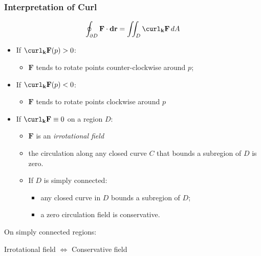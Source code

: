\begin{frame}
  \frametitle{Interpretation of Curl}

  $$\oint_{\partial D} \textbf{F} \cdot \textbf{dr} = \iint_D \curl_{\textbf{k}} \textbf{F} \, dA $$

  \begin{itemize}
    \item If $\curl_{\textbf{k}} \textbf{F}(p)>0$:
    \begin{itemize}
      \item \pause $\textbf{F}$ tends to rotate points counter-clockwise around $p$;
    \end{itemize}

    \item If $\curl_{\textbf{k}} \textbf{F}(p)<0$:
    \begin{itemize}
      \item \pause $\textbf{F}$ tends to rotate points clockwise around $p$
    \end{itemize}

    \item If $\curl_{\textbf{k}} \textbf{F} \equiv 0$ on a region $D$:
    \begin{itemize}
      \item \pause $\textbf{F}$ is an \emph{irrotational field}
      \item \pause the circulation along any closed curve $C$ that bounds a subregion of $D$ is zero.
      \item \pause If $D$ is simply connected:
      \begin{itemize}
        \item \pause any closed curve in $D$ bounds a subregion of $D$;
        \item \pause a zero circulation field is conservative.
      \end{itemize}
    \end{itemize}
  \end{itemize}

\pause On simply connected regions:
\begin{center}
  Irrotational field $\Longleftrightarrow$ Conservative field
\end{center}

\end{frame}

